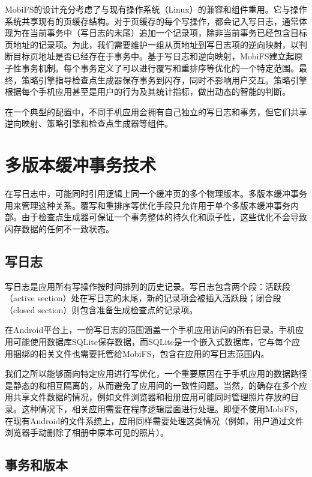 MobiFS的设计充分考虑了与现有操作系统（Linux）的兼容和组件重用。它与操作系统共享现有的页缓存结构。对于页缓存的每个写操作，都会记入写日志，通常体现为在当前事务中（写日志的末尾）追加一个记录项，除非当前事务已经包含目标页地址的记录项。为此，我们需要维护一组从页地址到写日志项的逆向映射，以判断目标页地址是否已经存在于事务中。基于写日志和逆向映射，MobiFS建立起原子性事务机制。每个事务定义了可以进行覆写和重排序等优化的一个特定范围。最终，策略引擎指导检查点生成器保存事务到闪存，同时不影响用户交互。策略引擎根据每个手机应用甚至是用户的行为及其统计指标，做出动态的智能的判断。

在一个典型的配置中，不同手机应用会拥有自己独立的写日志和事务，但它们共享逆向映射、策略引擎和检查点生成器等组件。

\section{多版本缓冲事务技术}

在写日志中，可能同时引用逻辑上同一个缓冲页的多个物理版本。多版本缓冲事务用来管理这种关系。覆写和重排序等优化手段只允许用于单个多版本缓冲事务内部。由于检查点生成器可保证一个事务整体的持久化和原子性，这些优化不会导致闪存数据的任何不一致状态。

\subsection{写日志}

写日志是应用所有写操作按时间排列的历史记录。写日志包含两个段：活跃段（active section）处在写日志的末尾，新的记录项会被插入活跃段；闭合段（closed section）则包含准备生成检查点的记录项。 
 
在Android平台上，一份写日志的范围涵盖一个手机应用访问的所有目录。手机应用可能使用数据库SQLite保存数据，而SQLite是一个嵌入式数据库，它与每个应用捆绑的相关文件也需要托管给MobiFS，包含在应用的写日志范围内。
 
我们之所以能够面向特定应用进行写优化，一个重要原因在于手机应用的数据路径是静态的和相互隔离的，从而避免了应用间的一致性问题。当然，的确存在多个应用共享文件数据的情况，例如文件浏览器和相册应用可能同时管理照片存放的目录。这种情况下，相关应用需要在程序逻辑层面进行处理。即便不使用MobiFS，在现有Android的文件系统上，应用同样需要处理这类情况（例如，用户通过文件浏览器手动删除了相册中原本可见的照片）。 

\subsection{事务和版本}

